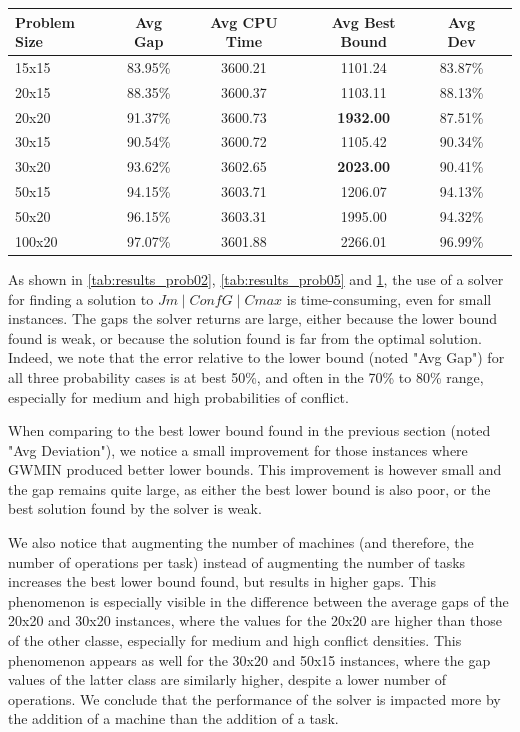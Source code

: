 \documentclass{mimosis}
\begin{document}
\begin{table}[h]
\centering
\begin{tabular}{lccccc}
Problem Size & Avg Gap & Avg CPU Time & Avg Best Bound & Avg Dev \\
\hline
15x15 & 83.95\% & 3600.21 & 1101.24 & 83.87\% \\
20x15 & 88.35\% & 3600.37 & 1103.11 & 88.13\% \\
20x20 & 91.37\% & 3600.73 & \textbf{1932.00} & 87.51\% \\
30x15 & 90.54\% & 3600.72 & 1105.42 & 90.34\% \\
30x20 & 93.62\% & 3602.65 & \textbf{2023.00} & 90.41\% \\
50x15 & 94.15\% & 3603.71 & 1206.07 & 94.13\% \\
50x20 & 96.15\% & 3603.31 & 1995.00 & 94.32\% \\
100x20 & 97.07\% & 3601.88 & 2266.01 & 96.99\% \\
\end{tabular}
\label{tab:results_prob08}
\end{table}

As shown in \cref{tab:results_prob02}, \cref{tab:results_prob05} and \cref{tab:results_prob08}, the use of a solver for finding a solution to \(Jm \mid ConfG \mid Cmax\) is time-consuming, even for small instances. The gaps the solver returns are large, either because the lower bound found is weak, or because the solution found is far from the optimal solution. Indeed, we note that the error relative to the lower bound (noted "Avg Gap") for all three probability cases is at best 50\%, and often in the 70\% to 80\% range, especially for medium and high probabilities of conflict.

When comparing to the best lower bound found in the previous section (noted "Avg Deviation"), we notice a small improvement for those instances where GWMIN produced better lower bounds. This improvement is however small and the gap remains quite large, as either the best lower bound is also poor, or the best solution found by the solver is weak.

We also notice that augmenting the number of machines (and therefore, the number of operations per task) instead of augmenting the number of tasks increases the best lower bound found, but results in higher gaps. This phenomenon is especially visible in the difference between the average gaps of the 20x20 and 30x20 instances, where the values for the 20x20 are higher than those of the other classe, especially for medium and high conflict densities. This phenomenon appears as well for the 30x20 and 50x15 instances, where the gap values of the latter class are similarly higher, despite a lower number of operations. We conclude that the performance of the solver is impacted more by the addition of a machine than the addition of a task.
\end{document}
